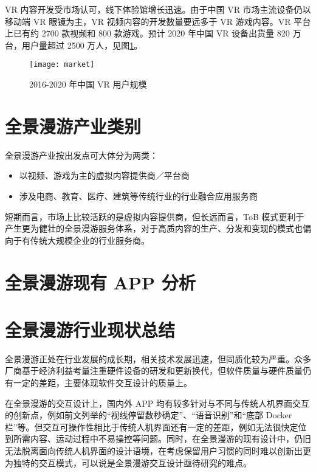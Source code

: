 VR 内容开发受市场认可，线下体验馆增长迅速。由于中国 VR 市场主流设备仍以移动端 VR 眼镜为主，VR 视频内容的开发数量要远多于 VR 游戏内容。VR 平台上已有约 2700 款视频和 800 款游戏。预计 2020 年中国 VR 设备出货量 820 万台，用户量超过 2500 万人，见图\ref{fig:market}。

\begin{figure}[h]
\centering
\texttt{[image: market]}
\caption{2016-2020 年中国 VR 用户规模}
\label{fig:market}
\end{figure}

\section{全景漫游产业类别}
全景漫游产业按出发点可大体分为两类：
\begin{itemize}
	\item 以视频、游戏为主的虚拟内容提供商／平台商
	\item 涉及电商、教育、医疗、建筑等传统行业的行业融合应用服务商
\end{itemize}

短期而言，市场上比较活跃的是虚拟内容提供商，但长远而言，ToB 模式更利于产生更为健壮的全景漫游服务体系，对于高质内容的生产、分发和变现的模式也偏向于有传统大规模企业的行业服务商。

\section{全景漫游现有 APP 分析}


\section{全景漫游行业现状总结}

全景漫游正处在行业发展的成长期，相关技术发展迅速，但同质化较为严重。众多厂商基于经济利益考量注重硬件设备的研发和更新换代，但软件质量与硬件质量仍有一定的差距，主要体现软件交互设计的质量上。

在全景漫游的交互设计上，国内外 APP 均有较多针对与不同与传统人机界面交互的创新点，例如前文列举的“视线停留数秒确定”、“语音识别”和“底部 Docker 栏”等。但交互可操作性相比于传统人机界面还有一定的差距，例如无法很快定位到所需内容、运动过程中不易操控等问题。同时，在全景漫游的现有设计中，仍旧无法脱离面向传统人机界面的设计语境，在考虑保留用户习惯的同时难以创新出更为独特的交互模式，可以说是全景漫游交互设计亟待研究的难点。
